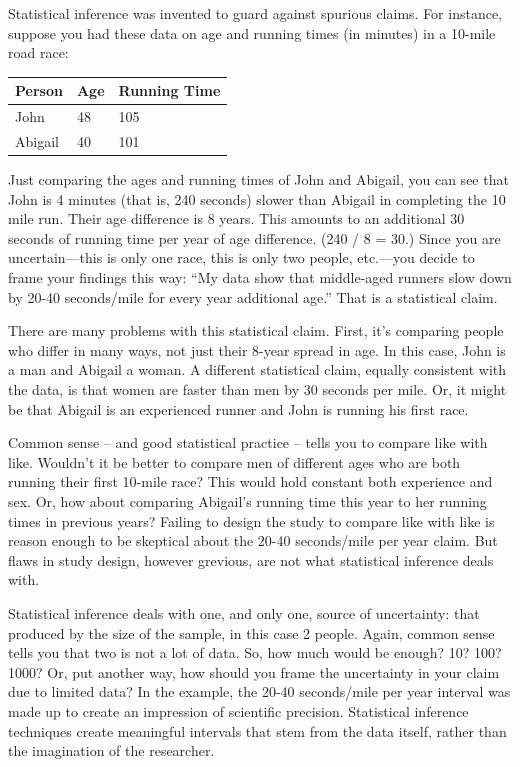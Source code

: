 \documentclass[]{tufte-book}
\begin{document}
Statistical inference was invented to guard against spurious claims. For instance, suppose you had these data on age and running times (in minutes) in a 10-mile road race:

\begin{longtable}[]{@{}lll@{}}
\toprule
Person & Age & Running Time\tabularnewline
\midrule
\endhead
John & 48 & 105\tabularnewline
Abigail & 40 & 101\tabularnewline
\bottomrule
\end{longtable}

Just comparing the ages and running times of John and Abigail, you can see that John is 4 minutes (that is, 240 seconds) slower than Abigail in completing the 10 mile run. Their age difference is 8 years. This amounts to an additional 30 seconds of running time per year of age difference. (240 / 8 = 30.) Since you are uncertain---this is only one race, this is only two people, etc.---you decide to frame your findings this way: ``My data show that middle-aged runners slow down by 20-40 seconds/mile for every year additional age.'' That is a statistical claim.

There are many problems with this statistical claim. First, it's comparing people who differ in many ways, not just their 8-year spread in age. In this case, John is a man and Abigail a woman. A different statistical claim, equally consistent with the data, is that women are faster than men by 30 seconds per mile. Or, it might be that Abigail is an experienced runner and John is running his first race.

Common sense -- and good statistical practice -- tells you to compare like with like. Wouldn't it be better to compare men of different ages who are both running their first 10-mile race? This would hold constant both experience and sex. Or, how about comparing Abigail's running time this year to her running times in previous years? Failing to design the study to compare like with like is reason enough to be skeptical about the 20-40 seconds/mile per year claim. But flaws in study design, however grevious, are not what statistical inference deals with.

Statistical inference deals with one, and only one, source of uncertainty: that produced by the size of the sample, in this case 2 people. Again, common sense tells you that two is not a lot of data. So, how much would be enough? 10? 100? 1000? Or, put another way, how should you frame the uncertainty in your claim due to limited data? In the example, the 20-40 seconds/mile per year interval was made up to create an impression of scientific precision. Statistical inference techniques create meaningful intervals that stem from the data itself, rather than the imagination of the researcher.
\end{document}
